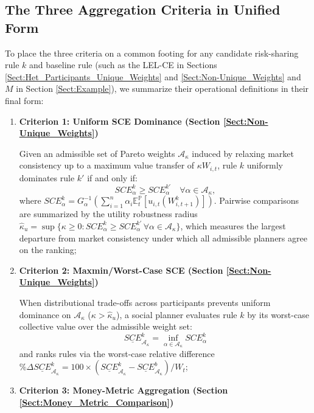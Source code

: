 \documentclass[11pt,a4paper]{article}
\theoremstyle{definition}
\theoremstyle{plain}
\theoremstyle{remark}
\newcommand{\E}{\mathbb{E}}
\renewcommand{\P}{\mathbb{P}}
\newcommand{\1}{\mathbf{1}}
\begin{document}
\subsection{The Three Aggregation Criteria in Unified Form}
To place the three criteria on a common footing for any candidate risk-sharing rule $k$ and baseline rule (such as the LEL-CE in Sections \ref{Sect:Het_Participants_Unique_Weights} and \ref{Sect:Non-Unique_Weights} and $M$ in Section \ref{Sect:Example}), we summarize their operational definitions in their final form:
\begin{enumerate}
    \item \textbf{Criterion 1: Uniform SCE Dominance (Section \ref{Sect:Non-Unique_Weights})}
    
    Given an admissible set of Pareto weights $\mathcal{A}_\kappa$ induced by relaxing market consistency up to a maximum value transfer of $\kappa W_{i,t}$, rule $k$ uniformly dominates rule $k'$ if and only if:
    \begin{equation}
        SCE_{\alpha}^k \ge SCE_{\alpha}^{k'} \quad \forall \alpha \in \mathcal{A}_\kappa,
    \end{equation}
    where $SCE_{\alpha}^k = G_{\alpha}^{-1}\left(\sum_{i=1}^n \alpha_i \E_t^{\P}[u_{i,t}(W_{i,t+1}^k)]\right)$. Pairwise comparisons are summarized by the utility robustness radius $\hat{\kappa}_u = \sup\{\kappa \ge 0 : SCE_{\alpha}^k \ge SCE_{\alpha}^{k'} \, \forall \alpha \in \mathcal{A}_\kappa\}$, which measures the largest departure from market consistency under which all admissible planners agree on the ranking;
    \item \textbf{Criterion 2: Maxmin/Worst-Case SCE (Section \ref{Sect:Non-Unique_Weights})}
    
    When distributional trade-offs across participants prevents uniform dominance on $\mathcal{A}_\kappa$ ($\kappa > \hat{\kappa}_u$), a social planner evaluates rule $k$ by its worst-case collective value over the admissible weight set:
    \begin{equation}
        \underline{SCE}_{\mathcal{A}_\kappa}^k = \inf_{\alpha \in \mathcal{A}_\kappa} SCE_{\alpha}^k
    \end{equation}
    and ranks rules via the worst-case relative difference $\%\Delta \underline{SCE}_{\mathcal{A}_\kappa}^k = 100 \times (\underline{SCE}_{\mathcal{A}_\kappa}^k - \underline{SCE}_{\mathcal{A}_\kappa}^b)/W_t$;
    \item \textbf{Criterion 3: Money-Metric Aggregation (Section \ref{Sect:Money_Metric_Comparison})}
    

\end{enumerate}
\end{document}
